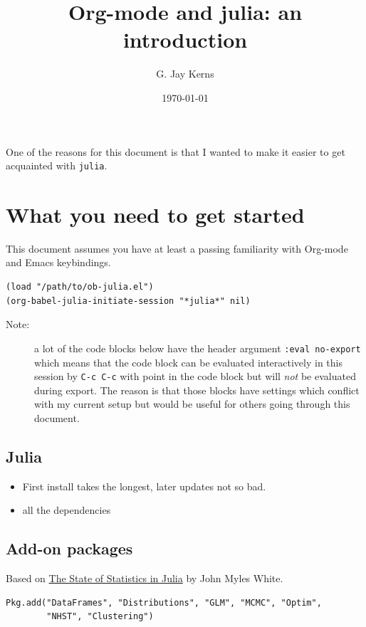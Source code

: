 \documentclass[11pt]{article}
\author{G. Jay Kerns}
\date{\today}
\title{Org-mode and julia: an introduction}
\begin{document}
\maketitle
\tableofcontents
\vspace*{1cm}

One of the reasons for this document is that I wanted to make it easier to get acquainted with \texttt{julia}.  

\section{What you need to get started}
\label{sec-1}

This document assumes you have at least a passing familiarity with Org-mode and Emacs keybindings.  

\begin{verbatim}
(load "/path/to/ob-julia.el")
(org-babel-julia-initiate-session "*julia*" nil)
\end{verbatim}

\begin{description}
\item[Note:] a lot of the code blocks below have the header argument \texttt{:eval no-export} which means that the code block can be evaluated interactively in this session by \texttt{C-c C-c} with point in the code block but will \emph{not} be evaluated during export.  The reason is that those blocks have settings which conflict with my current setup but would be useful for others going through this document.
\end{description}

\subsection{Julia}
\label{sec-1-1}
\begin{itemize}
\item First install takes the longest, later updates not so bad.
\item all the dependencies
\end{itemize}
\subsection{Add-on packages}
\label{sec-1-2}

Based on \href{http://www.johnmyleswhite.com/notebook/2012/12/02/the-state-of-statistics-in-julia/}{The State of Statistics in Julia} by John Myles White.

\begin{verbatim}
Pkg.add("DataFrames", "Distributions", "GLM", "MCMC", "Optim", 
        "NHST", "Clustering")
\end{verbatim}
\end{document}
